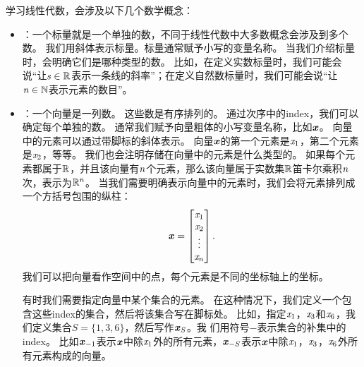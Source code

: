 学习线性代数，会涉及以下几个数学概念：
\begin{itemize}
    \item {}：一个标量就是一个单独的数，不同于线性代数中大多数概念会涉及到多个数。
    我们用斜体表示标量。标量通常赋予小写的变量名称。
    当我们介绍标量时，会明确它们是哪种类型的数。
    比如，在定义实数标量时，我们可能会说``让$\mathit{s} \in \mathbb{R}$表示一条线的斜率''；在定义自然数标量时，我们可能会说``让$\mathit{n}\in\mathbb{N}$表示元素的数目''。


    \item {}：一个向量是一列数。
    这些数是有序排列的。
    通过次序中的\gls{index}，我们可以确定每个单独的数。
    通常我们赋予向量粗体的小写变量名称，比如$\boldsymbol{\mathit{x}}$。
    向量中的元素可以通过带脚标的斜体表示。
    向量$\boldsymbol{\mathit{x}}$的第一个元素是$\mathit{x}_1$，第二个元素是$\mathit{x}_2$，等等。
    我们也会注明存储在向量中的元素是什么类型的。
    如果每个元素都属于$\mathbb{R}$，并且该向量有$\mathit{n}$个元素，那么该向量属于实数集$\mathbb{R}$笛卡尔乘积$\mathit{n}$次，表示为$\mathbb{R}^n$。
    当我们需要明确表示向量中的元素时，我们会将元素排列成一个方括号包围的纵柱：
    \begin{equation}
        \boldsymbol{\mathit{x}}=\begin{bmatrix} \mathit{x}_1   \\  
                            \mathit{x}_2   \\ 
                            \vdots  \\ 
                            \mathit{x}_n 
                \end{bmatrix}.
    \end{equation}
    我们可以把向量看作空间中的点，每个元素是不同的坐标轴上的坐标。
    
    有时我们需要指定向量中某个集合的元素。
    在这种情况下，我们定义一个包含这些\gls{index}的集合，然后将该集合写在脚标处。
    比如，指定$\mathit{x}_1$，$\mathit{x}_3$和$\mathit{x}_6$，我们定义集合$S=\{1,3,6\}$，然后写作$\boldsymbol{\mathit{x}}_S$。我
    们用符号$-$表示集合的补集中的\gls{index}。
    比如$\boldsymbol{\mathit{x}}_{-1}$表示$\boldsymbol{\mathit{x}}$中除$\mathit{x}_1$外的所有元素，$\boldsymbol{\mathit{x}}_{-S}$表示$\boldsymbol{\mathit{x}}$中除$\mathit{x}_1$，$\mathit{x}_3$，$\mathit{x}_6$外所有元素构成的向量。


\end{itemize}
